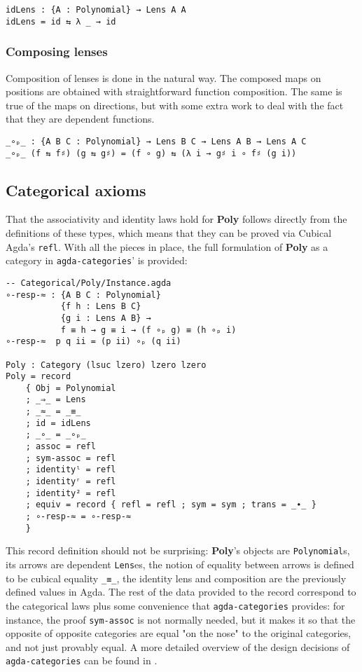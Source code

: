 \begin{verbatim}
idLens : {A : Polynomial} → Lens A A
idLens = id ⇆ λ _ → id
\end{verbatim}

\subsubsection{Composing lenses}
Composition of lenses is done in the natural way. The composed maps on positions are obtained with straightforward function composition. The same is true of the maps on directions, but with some extra work to deal with the fact that they are dependent functions.

\begin{verbatim}
_∘ₚ_ : {A B C : Polynomial} → Lens B C → Lens A B → Lens A C
_∘ₚ_ (f ⇆ f♯) (g ⇆ g♯) = (f ∘ g) ⇆ (λ i → g♯ i ∘ f♯ (g i))
\end{verbatim}

\subsection{Categorical axioms}

That the associativity and identity laws hold for \textbf{Poly} follows directly from the definitions of these types, which means that they can be proved via Cubical Agda's \texttt{refl}.
With all the pieces in place, the full formulation of \textbf{Poly} as a category in \texttt{agda-categories}' is provided:

\begin{verbatim}
-- Categorical/Poly/Instance.agda
∘-resp-≈ : {A B C : Polynomial} 
           {f h : Lens B C} 
           {g i : Lens A B} → 
           f ≡ h → g ≡ i → (f ∘ₚ g) ≡ (h ∘ₚ i)
∘-resp-≈  p q ii = (p ii) ∘ₚ (q ii)

Poly : Category (lsuc lzero) lzero lzero
Poly = record
    { Obj = Polynomial
    ; _⇒_ = Lens
    ; _≈_ = _≡_
    ; id = idLens
    ; _∘_ = _∘ₚ_
    ; assoc = refl
    ; sym-assoc = refl
    ; identityˡ = refl
    ; identityʳ = refl
    ; identity² = refl
    ; equiv = record { refl = refl ; sym = sym ; trans = _∙_ }
    ; ∘-resp-≈ = ∘-resp-≈
    }
\end{verbatim}

This record definition should not be surprising: \textbf{Poly}'s objects are \texttt{Polynomial}s, its arrows are dependent \texttt{Lens}es, the notion of equality between arrows is defined to be cubical equality \texttt{_≡_}, the identity lens and composition are the previously defined values in Agda.
The rest of the data provided to the record correspond to the categorical laws plus some convenience that \texttt{agda-categories} provides: for instance, the proof \texttt{sym-assoc} is not normally needed, but it makes it so that the opposite of opposite categories are equal "on the nose" to the original categories, and not just provably equal. 
A more detailed overview of the design decisions of \texttt{agda-categories} can be found in \cite{agda-cats}.

